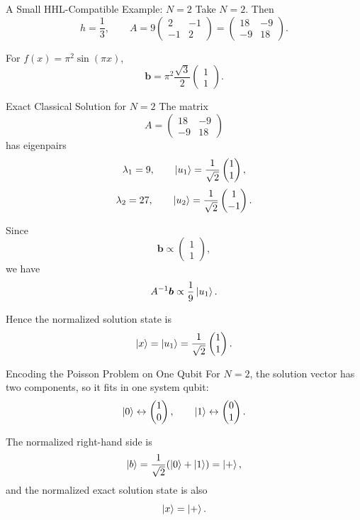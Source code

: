 \documentclass[aspectratio=169]{beamer}
\begin{document}
\begin{frame}{A Small HHL-Compatible Example: \(N=2\)}
Take \(N=2\). Then
\[
h=\frac{1}{3},
\qquad
A = 9
\begin{pmatrix}
2 & -1\\
-1 & 2
\end{pmatrix}
=
\begin{pmatrix}
18 & -9\\
-9 & 18
\end{pmatrix}.
\]

For \(f(x)=\pi^2\sin(\pi x)\),
\[
\bm{b}
=
\pi^2 \frac{\sqrt{3}}{2}
\begin{pmatrix}
1\\
1
\end{pmatrix}.
\]
\end{frame}

\begin{frame}{Exact Classical Solution for \(N=2\)}
The matrix
\[
A=
\begin{pmatrix}
18 & -9\\
-9 & 18
\end{pmatrix}
\]
has eigenpairs
\[
\lambda_1=9,
\qquad
\ket{u_1}=\frac{1}{\sqrt{2}}
\begin{pmatrix}
1\\
1
\end{pmatrix},
\]
\[
\lambda_2=27,
\qquad
\ket{u_2}=\frac{1}{\sqrt{2}}
\begin{pmatrix}
1\\
-1
\end{pmatrix}.
\]

Since
\[
\bm{b}\propto
\begin{pmatrix}
1\\1
\end{pmatrix},
\]
we have
\[
A^{-1}\bm{b}\propto \frac{1}{9}\ket{u_1}.
\]

Hence the normalized solution state is
\[
\ket{x}=\ket{u_1}
=
\frac{1}{\sqrt{2}}
\begin{pmatrix}
1\\1
\end{pmatrix}.
\]
\end{frame}

\begin{frame}{Encoding the Poisson Problem on One Qubit}
For \(N=2\), the solution vector has two components, so it fits in one system qubit:
\[
\ket{0}\leftrightarrow
\begin{pmatrix}
1\\0
\end{pmatrix},
\qquad
\ket{1}\leftrightarrow
\begin{pmatrix}
0\\1
\end{pmatrix}.
\]

The normalized right-hand side is
\[
\ket{b} = \frac{1}{\sqrt{2}}(\ket{0}+\ket{1}) = \ket{+},
\]
and the normalized exact solution state is also
\[
\ket{x}=\ket{+}.
\]
\end{frame}
\end{document}
